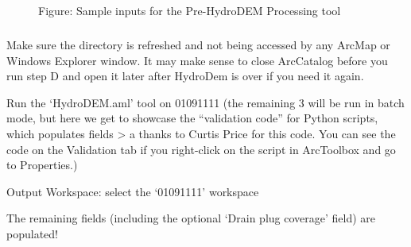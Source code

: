 \documentclass[letterpaper,10pt,english]{sphinxmanual}
\begin{document}
\begin{figure}[htbp]
\centering
\capstart

\noindent{}
\caption{Figure: Sample inputs for the Pre-HydroDEM Processing tool}\label{\detokenize{ex_1:id15}}\end{figure}


\subparagraph{}
\label{\detokenize{ex_1:d-run-hydrodem-aml-from-arcmap}}
Make sure the directory is refreshed and not being accessed by any ArcMap or Windows Explorer window.  It may make sense to close ArcCatalog before you run step D and open it later after HydroDem is over if you need it again.

Run the ‘HydroDEM.aml’ tool on 01091111 (the remaining 3 will be run in batch mode, but here we get to showcase the “validation code” for Python scripts, which populates fields \textgreater{} a thanks to Curtis Price for this code. You can see the code on the Validation tab if you right-click on the script in ArcToolbox and go to Properties.)

Output Workspace: select the ‘01091111’ workspace

The remaining fields (including the optional ‘Drain plug coverage’ field) are populated!
\end{document}

